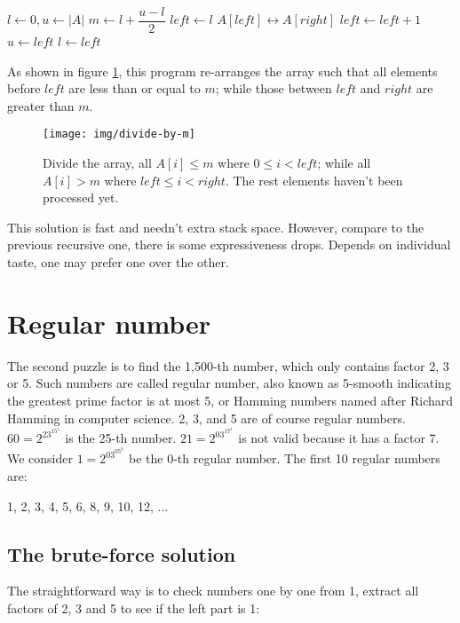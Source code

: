 \documentclass[b5paper]{article}
\begin{document}
\begin{algorithmic}[1]
  \State $l \gets 0, u \gets |A|$
    \State $m \gets l + \dfrac{u - l}{2}$
    \State $left \gets l$
        \State $A[left] \leftrightarrow A[right]$
        \State $left \gets left + 1$
      \EndIf
    \EndFor
      \State $u \gets left$
    \Else
      \State $l \gets left$
    \EndIf
  \EndWhile
\EndFunction
\end{algorithmic}

As shown in figure \ref{fig:divide}, this program re-arranges the array such that all elements before $left$ are less than or equal to $m$; while those between $left$ and $right$ are greater than $m$.

\begin{figure}[htbp]
  \centering
  \texttt{[image: img/divide-by-m]}
  \caption{Divide the array, all $A[i] \leq m$ where $0 \leq i < left$; while all $A[i] > m$ where $left \leq i < right$. The rest elements haven't been processed yet.} \label{fig:divide}
\end{figure}

This solution is fast and needn't extra stack space. However, compare to the previous recursive one, there is some expressiveness drops. Depends on individual taste, one may prefer one over the other.

\section{Regular number}

The second puzzle is to find the 1,500-th number, which only contains factor 2, 3 or 5. Such numbers are called regular number, also known as 5-smooth indicating the greatest prime factor is at most 5, or Hamming numbers named after Richard Hamming in computer science. 2, 3, and 5 are of course regular numbers. $60 = 2^23^15^1$ is the 25-th number. $21 = 2^03^17^1$ is not valid because it has a factor 7. We consider $1=2^03^05^0$ be the 0-th regular number. The first 10 regular numbers are:

1, 2, 3, 4, 5, 6, 8, 9, 10, 12, ...

\subsection{The brute-force solution}
The straightforward way is to check numbers one by one from 1, extract all factors of 2, 3 and 5 to see if the left part is 1:
\end{document}

